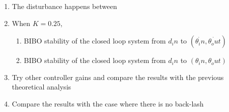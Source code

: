 \begin{enumerate}
  \item The disturbance happens between 
  \item When $K=0.25$,
  \begin{enumerate}
  \item BIBO stability of the closed loop system from $d_in$ to $(\dot{\theta_in},\dot{\theta_out})$ 
  \item BIBO stability of the closed loop system from $d_in$ to $(\theta_in,\theta_out)$
  \end{enumerate}
  \item Try other controller gains and compare the results with the previous theoretical analysis
  \item Compare the results with the case where there is no back-lash
\end{enumerate}




